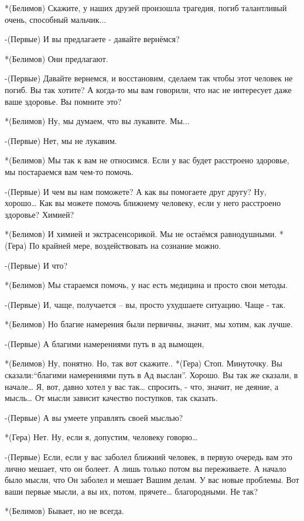 *(Белимов) Скажите, у наших друзей произошла трагедия, погиб талантливый очень, способный мальчик...

-(Первые) И вы предлагаете - давайте вернёмся?

*(Белимов) Они предлагают.

-(Первые) Давайте вернемся, и восстановим, сделаем так чтобы этот человек не погиб. Вы так хотите? А когда-то мы вам говорили, что нас не интересует даже ваше здоровье. Вы помните это?

*(Белимов) Ну, мы думаем, что вы лукавите. Мы...

-(Первые) Нет, мы не лукавим.

*(Белимов) Мы так к вам не относимся. Если у вас будет расстроено здоровье,  мы постараемся вам чем-то помочь.

-(Первые) И чем вы нам поможете? А как вы помогаете друг другу? Ну, хорошо… Как вы можете помочь ближнему человеку, если у него расстроено здоровье? Химией?

*(Белимов) И химией и экстрасенсорикой. Мы не остаёмся равнодушными.
*(Гера) По крайней мере, воздействовать на сознание можно.

-(Первые) И что?

*(Белимов) Мы стараемся помочь, у нас есть медицина и просто свои методы.

-(Первые) И, чаще, получается – вы, просто ухудшаете ситуацию. Чаще - так.

*(Белимов) Но благие намерения были первичны, значит, мы хотим, как лучше. 

-(Первые) А благими намерениями путь в ад вымощен, 

*(Белимов) Ну, понятно. Но, так вот скажите..
*(Гера) Стоп. Минуточку. Вы сказали:“благими намерениями путь в Ад выслан”. Хорошо. Вы так же сказали, в начале… Я, вот, давно хотел у вас так… спросить, - что, значит, не деяние, а мысль… От мысли зависит качество поступков, так сказать.

-(Первые) А вы умеете управлять своей мыслью?

*(Гера) Нет. Ну, если я, допустим, человеку говорю…

-(Первые) Если, если у вас заболел ближний человек, в первую очередь вам это лично мешает, что он болеет. А лишь только потом вы переживаете. А начало было мысли, что Он заболел и мешает Вашим делам. У вас новые проблемы. Вот ваши первые мысли, а вы их, потом, прячете… благородными. Не так?

*(Белимов) Бывает, но не всегда.

